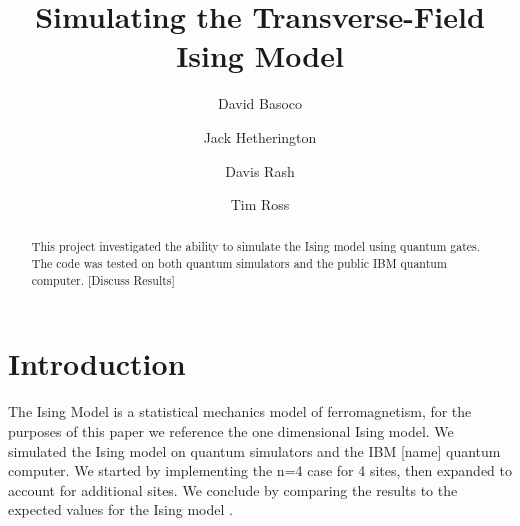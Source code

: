 \documentclass[acmtog]{acmart}
\begin{document}
\title{Simulating the Transverse-Field Ising Model}

\author{David Basoco}
\author{Jack Hetherington}

\author{Davis Rash}

\author{Tim Ross}

\begin{abstract}
 This project investigated the ability to simulate the Ising model using quantum gates. The code was tested on both quantum simulators and the public IBM quantum computer. [Discuss Results]
\end{abstract}



\maketitle

\section{Introduction}
The Ising Model is a statistical mechanics model of ferromagnetism, for the purposes of this paper we reference the one dimensional Ising model. We simulated the Ising model on quantum simulators and the IBM [name] quantum computer. We started by implementing the n=4 case for 4 sites, then expanded to account for additional sites. We conclude by comparing the results to the expected values for the Ising model \cite{Cervera18}.
\end{document}
